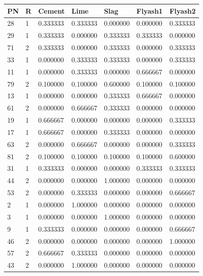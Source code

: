 {\begin{tabular}{|l|l|l|l|l|l|l|}
\toprule
	PN & R & Cement & Lime & Slag & Flyash1 & Flyash2 \\ \hline      
        28 & 1 & 0.333333 & 0.333333 & 0.000000 & 0.000000 & 0.333333 \\ \hline
        29 & 1 & 0.333333 & 0.000000 & 0.333333 & 0.333333 & 0.000000 \\ \hline
        71 & 2 & 0.333333 & 0.000000 & 0.333333 & 0.000000 & 0.333333 \\ \hline
        33 & 1 & 0.000000 & 0.333333 & 0.333333 & 0.000000 & 0.333333 \\ \hline
        11 & 1 & 0.000000 & 0.333333 & 0.000000 & 0.666667 & 0.000000 \\ \hline
        79 & 2 & 0.100000 & 0.100000 & 0.600000 & 0.100000 & 0.100000 \\ \hline
        13 & 1 & 0.000000 & 0.000000 & 0.333333 & 0.666667 & 0.000000 \\ \hline
        61 & 2 & 0.000000 & 0.666667 & 0.333333 & 0.000000 & 0.000000 \\ \hline
        19 & 1 & 0.666667 & 0.000000 & 0.000000 & 0.000000 & 0.333333 \\ \hline
        17 & 1 & 0.666667 & 0.000000 & 0.333333 & 0.000000 & 0.000000 \\ \hline
        63 & 2 & 0.000000 & 0.666667 & 0.000000 & 0.000000 & 0.333333 \\ \hline
        81 & 2 & 0.100000 & 0.100000 & 0.100000 & 0.100000 & 0.600000 \\ \hline
        31 & 1 & 0.333333 & 0.000000 & 0.000000 & 0.333333 & 0.333333 \\ \hline
        44 & 2 & 0.000000 & 0.000000 & 1.000000 & 0.000000 & 0.000000 \\ \hline
        53 & 2 & 0.000000 & 0.333333 & 0.000000 & 0.000000 & 0.666667 \\ \hline
        2 & 1 & 0.000000 & 1.000000 & 0.000000 & 0.000000 & 0.000000 \\ \hline
        3 & 1 & 0.000000 & 0.000000 & 1.000000 & 0.000000 & 0.000000 \\ \hline
        9 & 1 & 0.333333 & 0.000000 & 0.000000 & 0.000000 & 0.666667 \\ \hline
        46 & 2 & 0.000000 & 0.000000 & 0.000000 & 0.000000 & 1.000000 \\ \hline
        57 & 2 & 0.666667 & 0.333333 & 0.000000 & 0.000000 & 0.000000 \\ \hline
        43 & 2 & 0.000000 & 1.000000 & 0.000000 & 0.000000 & 0.000000 \\ \hline

\end{tabular}}
